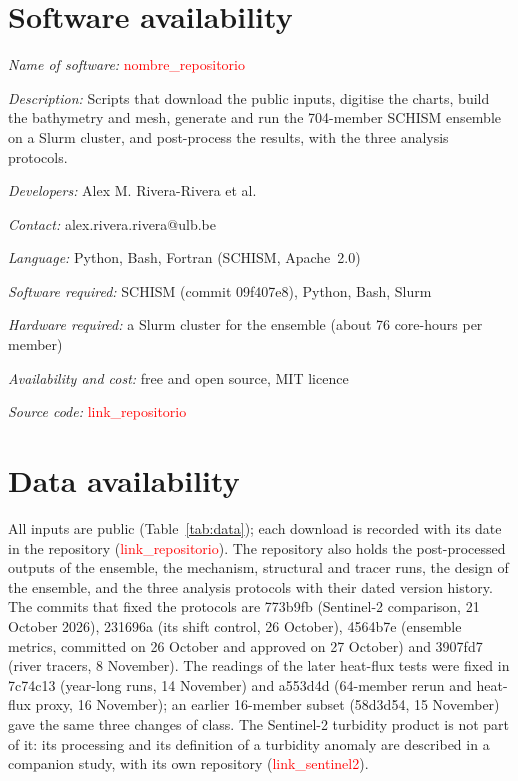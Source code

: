 \documentclass[a4paper,fleqn]{ems-dc}
\newcommand{\ph}[1]{\textcolor{red}{\textsf{#1}}}
\begin{document}
\section*{Software availability}
\noindent\textit{Name of software:} \ph{nombre\_repositorio}\par
\noindent\textit{Description:} Scripts that download the public inputs, digitise the
charts, build the bathymetry and mesh, generate and run the 704-member SCHISM ensemble on
a Slurm cluster, and post-process the results, with the three analysis protocols.\par
\noindent\textit{Developers:} Alex M. Rivera-Rivera et al.\par
\noindent\textit{Contact:} alex.rivera.rivera@ulb.be\par
\noindent\textit{Language:} Python, Bash, Fortran (SCHISM, Apache~2.0)\par
\noindent\textit{Software required:} SCHISM (commit 09f407e8), Python, Bash, Slurm\par
\noindent\textit{Hardware required:} a Slurm cluster for the ensemble (about 76 core-hours
per member)\par
\noindent\textit{Availability and cost:} free and open source, MIT licence\par
\noindent\textit{Source code:} \ph{link\_repositorio}

\section*{Data availability}
All inputs are public (Table~\ref{tab:data}); each download is recorded with its date in
the repository (\ph{link\_repositorio}). The repository also holds the post-processed
outputs of the ensemble, the mechanism, structural and tracer runs, the design of the
ensemble, and the three analysis protocols with their dated version history. The commits
that fixed the protocols are 773b9fb (Sentinel-2 comparison, 21 October 2026), 231696a (its
shift control, 26 October), 4564b7e (ensemble metrics, committed on 26 October and approved
on 27 October) and 3907fd7 (river tracers, 8 November). The readings of the later heat-flux tests were fixed in 7c74c13 (year-long runs,
14 November) and a553d4d (64-member rerun and heat-flux proxy, 16 November); an earlier
16-member subset (58d3d54, 15 November) gave the same three changes of class. The Sentinel-2 turbidity product is
not part of it: its processing and its definition of a turbidity anomaly are described in a
companion study, with its own repository (\ph{link\_sentinel2}).
\end{document}
